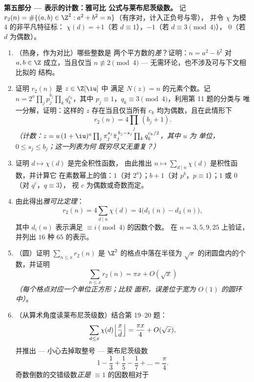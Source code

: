 \begin{problem}
\medskip
\noindent\textbf{第五部分 --- 表示的计数：雅可比
公式与莱布尼茨级数。} 记 $r_2(n) = \#\{(a, b) \in
\Z^2 : a^2 + b^2 = n\}$（有序对，计入正负号与零），
并令 $\chi$ 为模 $4$ 的非平凡特征标：
$\chi(d) = +1$（若 $d \equiv 1$），$-1$（若 $d \equiv 3 \pmod4$），
$0$（若 $d$ 为偶数）。
\begin{enumerate}[resume]
  \item （热身，作为对比）哪些整数是
        两个平方数的\emph{差}？证明：$n = a^2 - b^2$
        对 $a, b \in \Z$ 成立，当且仅当 $n \not\equiv 2 \pmod 4$ ---
        无需环论，也不涉及可与下文相比拟的
        结构。
  \item 证明 $r_2(n)$ 是 $z \in \Z[\iu]$ 中
        满足 $N(z) = n$ 的元素个数。记 $n = 2^{a}\prod_jp_j^{b_j}
        \prod_kq_k^{c_k}$，其中 $p_j \equiv 1$，$q_k \equiv 3
        \pmod4$，利用第 11 题的分类与
        唯一分解，证明：这样的 $z$ 存在当且仅当所有
        $c_k$ 均为偶数，且在此情形下
        \[
        r_2(n) = 4\prod_j\,(b_j + 1) .
        \]
        \emph{（计数：$z = u\,(1+\iu)^{a}\prod_j\pi_j^{s_j}
        \bar\pi_j^{\,b_j - s_j}\prod_kq_k^{c_k/2}$，其中 $u$ 为
        单位，$0 \leq s_j \leq b_j$；这一列表为何
        既穷尽又无重复？）}
  \item 证明 $d \mapsto \chi(d)$ 是完全积性函数，
        由此推出 $n \mapsto
        \sum_{d \mid n}\chi(d)$ 是积性函数，并计算它
        在素数幂上的值：$1$（对 $2^a$）；$b + 1$（对
        $p^b$，$p \equiv 1$）；$1$ 或 $0$（对 $q^c$，$q \equiv 3$），
        视 $c$ 为偶数或奇数而定。
  \item 由此得出\emph{雅可比定理}：
        \[
        r_2(n) = 4\sum_{d \mid n}\chi(d) =
        4\bigl(d_1(n) - d_3(n)\bigr),
        \]
        其中 $d_i(n)$ 表示满足 $\equiv i \pmod 4$ 的因数个数。
        在 $n = 3, 5, 9, 25$ 上验证，并列出
        $16$ 种 $65$ 的表示。
  \item （圆）证明 $\sum_{n \leq x}r_2(n)$ 是
        $\Z^2$ 的格点中落在半径为
        $\sqrt x$ 的闭圆盘内的个数，并证明
        \[
        \sum_{n\leq x}r_2(n) = \pi x + O(\sqrt x)
        \]
        \emph{（每个格点对应一个单位正方形；比较
        面积，误差位于宽为
        $O(1)$ 的圆环中）}。
  \item （从算术角度读莱布尼茨级数）结合第 19--20 题：
        \[
        \sum_{d \leq x}\chi(d)\Bigl\lfloor\frac
        xd\Bigr\rfloor = \frac{\pi x}4 + O(\sqrt x),
        \]
        并推出 --- 小心去掉取整号 ---
        莱布尼茨级数
        \[
        1 - \frac13 + \frac15 - \frac17 + \dots = \frac\pi4 .
        \]
        奇数倒数的交错级数\emph{正是}
        $\equiv 1$ 的因数相对于

\end{enumerate}
\end{problem}
